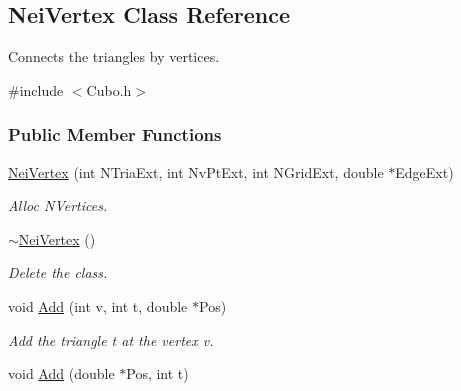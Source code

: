 \hypertarget{classNeiVertex}{\subsection{\-Nei\-Vertex \-Class \-Reference}
\label{classNeiVertex}
}


\-Connects the triangles by vertices.  




{\ttfamily \#include $<$\-Cubo.\-h$>$}

\subsubsection*{\-Public \-Member \-Functions}
\begin{DoxyCompactItemize}
\item 
\hypertarget{classNeiVertex_acd292e575bf4ade488a69f62b2d454ad}{\hyperlink{classNeiVertex_acd292e575bf4ade488a69f62b2d454ad}{\-Nei\-Vertex} (int \-N\-Tria\-Ext, int \-Nv\-Pt\-Ext, int \-N\-Grid\-Ext, double $\ast$\-Edge\-Ext)}\label{classNeiVertex_acd292e575bf4ade488a69f62b2d454ad}

\begin{DoxyCompactList}\small\item\em \-Alloc \-N\-Vertices. \end{DoxyCompactList}\item 
\hypertarget{classNeiVertex_ab53f242febf6312ccd82ee9c28c2b633}{\hyperlink{classNeiVertex_ab53f242febf6312ccd82ee9c28c2b633}{$\sim$\-Nei\-Vertex} ()}\label{classNeiVertex_ab53f242febf6312ccd82ee9c28c2b633}

\begin{DoxyCompactList}\small\item\em \-Delete the class. \end{DoxyCompactList}\item 
\hypertarget{classNeiVertex_ab46ead706c925650dc870081c73da25f}{void \hyperlink{classNeiVertex_ab46ead706c925650dc870081c73da25f}{\-Add} (int v, int t, double $\ast$\-Pos)}\label{classNeiVertex_ab46ead706c925650dc870081c73da25f}

\begin{DoxyCompactList}\small\item\em \-Add the triangle t at the vertex v. \end{DoxyCompactList}\item 
\hypertarget{classNeiVertex_a23175dfa70c692054cf173193a6d4d6e}{void \hyperlink{classNeiVertex_a23175dfa70c692054cf173193a6d4d6e}{\-Add} (double $\ast$\-Pos, int t)}\label{classNeiVertex_a23175dfa70c692054cf173193a6d4d6e}


\end{DoxyCompactItemize}
